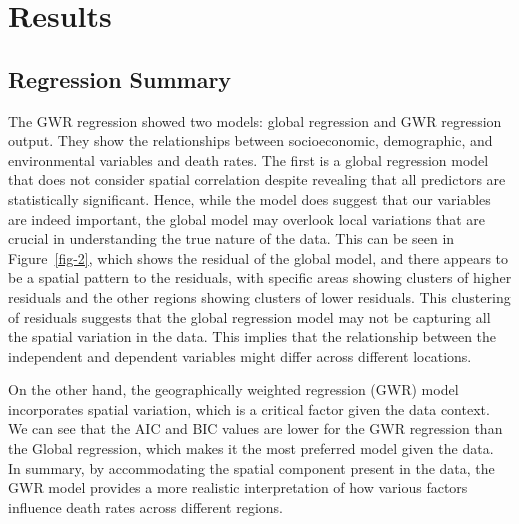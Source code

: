 \documentclass[
]{article}
\begin{document}
\section{Results}\label{results}

\subsection{Regression Summary}\label{regression-summary}

The GWR regression showed two models: global regression and GWR
regression output. They show the relationships between socioeconomic,
demographic, and environmental variables and death rates. The first is a
global regression model that does not consider spatial correlation
despite revealing that all predictors are statistically significant.
Hence, while the model does suggest that our variables are indeed
important, the global model may overlook local variations that are
crucial in understanding the true nature of the data. This can be seen
in Figure~\ref{fig-2}, which shows the residual of the global model, and
there appears to be a spatial pattern to the residuals, with specific
areas showing clusters of higher residuals and the other regions showing
clusters of lower residuals. This clustering of residuals suggests that
the global regression model may not be capturing all the spatial
variation in the data. This implies that the relationship between the
independent and dependent variables might differ across different
locations.

On the other hand, the geographically weighted regression (GWR) model
incorporates spatial variation, which is a critical factor given the
data context. We can see that the AIC and BIC values are lower for the
GWR regression than the Global regression, which makes it the most
preferred model given the data.~ In summary, by accommodating the
spatial component present in the data, the GWR model provides a more
realistic interpretation of how various factors influence death rates
across different regions.
\end{document}

